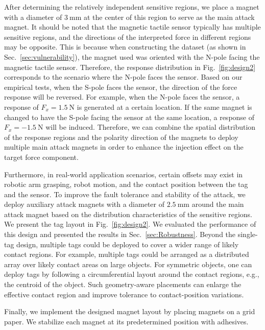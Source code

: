 After determining the relatively independent sensitive regions, we place a magnet with a diameter of $3~\mathrm{mm}$ at the center of this region to serve as the main attack magnet.
It should be noted that the magnetic tactile sensor typically has multiple sensitive regions, and the directions of the interpreted force in different regions may be opposite.
This is because when constructing the dataset (as shown in Sec.~\ref{sec:vulnerability}), the magnet used was oriented with the N-pole facing the magnetic tactile sensor. 
Therefore, the response distribution in Fig.~\ref{fig:design2} corresponds to the scenario where the N-pole faces the sensor. 
Based on our empirical tests, when the S-pole faces the sensor, the direction of the force response will be reversed. 
For example, when the N-pole faces the sensor, a response of $F_x=1.5~\mathrm{N}$ is generated at a certain location. 
If the same magnet is changed to have the S-pole facing the sensor at the same location, a response of $F_x=-1.5~\mathrm{N}$ will be induced. 
Therefore, we can combine the spatial distribution of the response regions and the polarity direction of the magnets to deploy multiple main attack magnets in order to enhance the injection effect on the target force component.

Furthermore, in real-world application scenarios, certain offsets may exist in robotic arm grasping, robot motion, and the contact position between the tag and the sensor. 
To improve the fault tolerance and stability of the attack, we deploy auxiliary attack magnets with a diameter of $2.5~\mathrm{mm}$ around the main attack magnet based on the distribution characteristics of the sensitive regions.
We present the tag layout in Fig.~\ref{fig:design2}. 
We evaluated the performance of this design and presented the results in Sec.~\ref{sec:Robustness}. Beyond the single-tag design, multiple {\name} tags could be deployed to cover a wider range of likely contact regions. 
For example, multiple tags could be arranged as a distributed array over likely contact areas on large objects. 
For symmetric objects, one can deploy tags by following a circumferential layout around the contact regions, e.g., the centroid of the object. 
Such geometry-aware placements can enlarge the effective contact region and improve tolerance to contact-position variations.

Finally, we implement the designed magnet layout by placing magnets on a grid paper. 
We stabilize each magnet at its predetermined position with adhesives.

